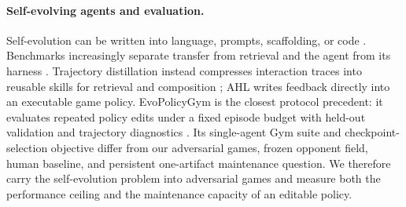 \paragraph{Self-evolving agents and evaluation.}
Self-evolution can be written into language, prompts, scaffolding, or code
\citep{selfrefine2023,reflexion2023,expel2024,promptbreeder2023,textgrad2024,adas2024,
funsearch2024,stop2023,voyager2023,alphaevolve2025}. Benchmarks increasingly separate
transfer from retrieval and the agent from its harness \citep{agentcl2026,clbench2026,
harnessengineering2026}. Trajectory distillation instead compresses interaction traces
into reusable skills for retrieval and composition \citep{browserbc2026}; AHL writes
feedback directly into an executable game policy. EvoPolicyGym is the closest protocol
precedent: it evaluates repeated policy edits under a fixed episode budget with held-out
validation and trajectory diagnostics \citep{evopolicygym2026}. Its single-agent Gym
suite and checkpoint-selection objective differ from our adversarial games, frozen
opponent field, human baseline, and persistent one-artifact maintenance question. We
therefore carry the self-evolution problem into adversarial games and measure both the
performance ceiling and the maintenance capacity of an editable policy.
